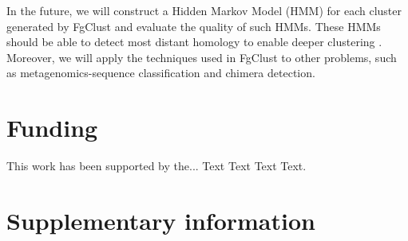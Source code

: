 \documentclass{bioinfo}
\begin{document}
In the future, we will construct a Hidden Markov Model (HMM) for each cluster generated by FgClust and evaluate the quality of such HMMs. These HMMs should be able to detect most distant homology to enable deeper clustering \citep{steinegger2017mmseqs2}.
Moreover, we will apply the techniques used in FgClust to other problems, such as metagenomics-sequence classification and chimera detection.%


\section*{Funding}

This work has been supported by the... Text Text  Text Text.\vspace*{-12pt}

%
%
%
%
%
%
%
%
%





\clearpage{}

\section*{Supplementary information}
\end{document}
